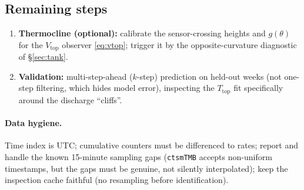 \documentclass[11pt,a4paper]{article}
\newcommand{\Ttop}{T_{\mathrm{top}}}
\newcommand{\Vtop}{V_{\mathrm{top}}}
\begin{document}
\subsection{Remaining steps}
\begin{enumerate}[nosep]
  \item \textbf{Thermocline (optional):} calibrate the sensor-crossing heights and
        $g(\theta)$ for the $\Vtop$ observer \eqref{eq:vtop}; trigger it by the
        opposite-curvature diagnostic of \S\ref{sec:tank}.
  \item \textbf{Validation:} multi-step-ahead ($k$-step) prediction on held-out
        weeks (not one-step filtering, which hides model error), inspecting the
        $\Ttop$ fit specifically around the discharge ``cliffs''.
\end{enumerate}

\paragraph{Data hygiene.}
Time index is UTC; cumulative counters must be differenced to rates; report and
handle the known 15-minute sampling gaps (\texttt{ctsmTMB} accepts non-uniform
timestamps, but the gaps must be genuine, not silently interpolated); keep the
inspection cache faithful (no resampling before identification).
\end{document}
